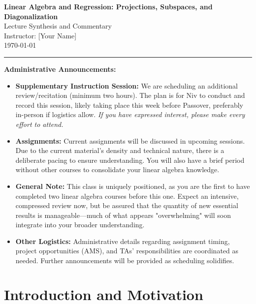 \documentclass[12pt]{article}
\theoremstyle{definition}
\theoremstyle{plain}
\theoremstyle{remark}
\begin{document}
\begin{center}
    {\LARGE\bfseries Linear Algebra and Regression: Projections, Subspaces, and Diagonalization}\\[1.2ex]
    {\large Lecture Synthesis and Commentary}\\[0.8ex]
    {\large Instructor: [Your Name]}\\[0.8ex]
    \today 
\end{center}

\hrule
\vspace{1ex}
\begin{administrativenote}
    \textbf{Administrative Announcements:}
    \begin{itemize}
        \item \textbf{Supplementary Instruction Session:} We are scheduling an additional review/recitation (minimum two hours). The plan is for Niv to conduct and record this session, likely taking place this week before Passover, preferably in-person if logistics allow. \emph{If you have expressed interest, please make every effort to attend.}
        \item \textbf{Assignments:} Current assignments will be discussed in upcoming sessions. Due to the current material's density and technical nature, there is a deliberate pacing to ensure understanding. You will also have a brief period without other courses to consolidate your linear algebra knowledge.
        \item \textbf{General Note:} This class is uniquely positioned, as you are the first to have completed two linear algebra courses before this one. Expect an intensive, compressed review now, but be assured that the quantity of new essential results is manageable---much of what appears "overwhelming" will soon integrate into your broader understanding.
        \item \textbf{Other Logistics:} Administrative details regarding assignment timing, project opportunities (AMS), and TAs' responsibilities are coordinated as needed. Further announcements will be provided as scheduling solidifies.
    \end{itemize}
\end{administrativenote}

\vspace{1.5em}
%
%
\section{Introduction and Motivation}
\end{document}
